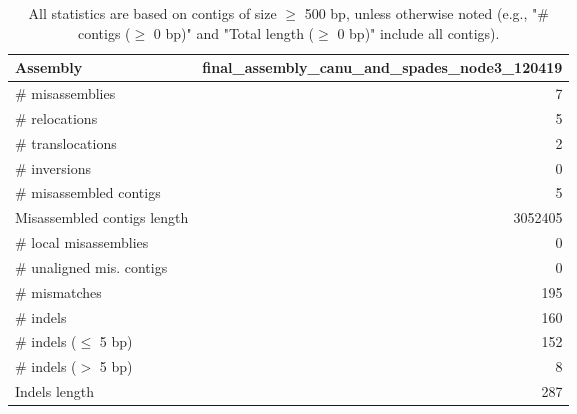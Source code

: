 \documentclass[12pt,a4paper]{article}
\begin{document}
\begin{table}[ht]
\begin{center}
\caption{All statistics are based on contigs of size $\geq$ 500 bp, unless otherwise noted (e.g., "\# contigs ($\geq$ 0 bp)" and "Total length ($\geq$ 0 bp)" include all contigs).}
\begin{tabular}{|l*{1}{|r}|}
\hline
Assembly & final\_assembly\_canu\_and\_spades\_node3\_120419 \\ \hline
\# misassemblies & 7 \\ \hline
\hspace{5mm}\# relocations & 5 \\ \hline
\hspace{5mm}\# translocations & 2 \\ \hline
\hspace{5mm}\# inversions & 0 \\ \hline
\# misassembled contigs & 5 \\ \hline
Misassembled contigs length & 3052405 \\ \hline
\# local misassemblies & 0 \\ \hline
\# unaligned mis. contigs & 0 \\ \hline
\# mismatches & 195 \\ \hline
\# indels & 160 \\ \hline
\hspace{5mm}\# indels ($\leq$ 5 bp) & 152 \\ \hline
\hspace{5mm}\# indels ($>$ 5 bp) & 8 \\ \hline
Indels length & 287 \\ \hline
\end{tabular}
\end{center}
\end{table}
\end{document}
